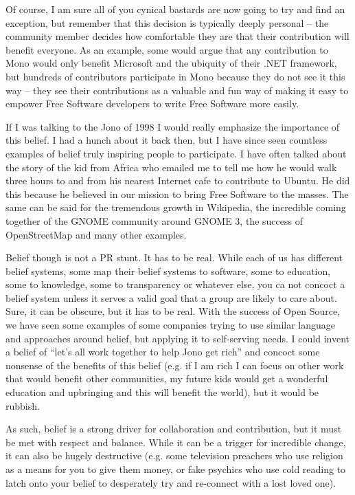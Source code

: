 Of course, I am sure all of you cynical bastards are now going to try and find
an exception, but remember that this decision is typically deeply personal --
the community member decides how comfortable they are that their contribution
will benefit everyone. As an example, some would argue that any contribution to
Mono would only benefit Microsoft and the ubiquity of their .NET framework, but
hundreds of contributors participate in Mono because they do not see it this way
-- they see their contributions as a valuable and fun way of making it easy to
empower Free Software developers to write Free Software more easily.

If I was talking to the Jono of 1998 I would really emphasize the importance of
this belief. I had a hunch about it back then, but I have since seen countless
examples of belief truly inspiring people to participate. I have often talked
about the story of the kid from Africa who emailed me to tell me how he would
walk three hours to and from his nearest Internet cafe to contribute to Ubuntu.
He did this because he believed in our mission to bring Free Software to the
masses. The same can be said for the tremendous growth in Wikipedia, the
incredible coming together of the GNOME community around GNOME 3, the success of
OpenStreetMap and many other examples.

Belief though is not a PR stunt. It has to be real. While each of us has
different belief systems, some map their belief systems to software, some to
education, some to knowledge, some to transparency or whatever else, you ca not
concoct a belief system unless it serves a valid goal that a group are likely to
care about. Sure, it can be obscure, but it has to be real. With the success of
Open Source, we have seen some examples of some companies trying to use similar
language and approaches around belief, but applying it to self-serving needs. I
could invent a belief of ``let’s all work together to help Jono get rich'' and
concoct some nonsense of the benefits of this belief (e.g. if I am rich I can
focus on other work that would benefit other communities, my future kids would
get a wonderful education and upbringing and this will benefit the world), but
it would be rubbish.

As such, belief is a strong driver for collaboration and contribution, but it
must be met with respect and balance. While it can be a trigger for incredible
change, it can also be hugely destructive (e.g. some television preachers who
use religion as a means for you to give them money, or fake psychics who use
cold reading to latch onto your belief to desperately try and re-connect with a
lost loved one).

